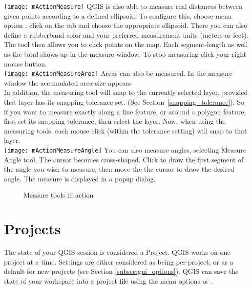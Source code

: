 \texttt{[image: mActionMeasure]}
QGIS is also able to measure real distances between given
points according to a defined ellipsoid. To configure this, choose menu option
 \arrow {},
click on the  tab and choose the appropriate ellipsoid. There
you can also define a rubberband color and your preferred measurement units
(meters or feet). The tool then allows you to click points on the map. Each
segment-length as well as the total shows up in the measure-window. To stop measuring click your right mouse button. \\
\texttt{[image: mActionMeasureArea]} Areas can also be measured.
In the measure window the accumulated area-size appears  \\
In addition, the measuring tool will snap to the currently selected layer, provided that layer has its snapping tolerance set. (See Section~\ref{snapping_tolerance}). So if you want to measure exactly along a line feature, or around a polygon feature, first set its snapping tolerance, then select the layer. Now, when using the measuring tools, each mouse click (within the tolerance setting) will snap to that layer. \\
\texttt{[image: mActionMeasureAngle]}
You can also measure angles, selecting Measure Angle tool. The cursor becomes
cross-shaped. Click to draw the first segment of the angle you wish to
measure, then move the the cursor to draw the desired angle. The measure
is displayed in a popup dialog.

\begin{figure}[ht]
\centering
     \hspace{0.33cm}
     \hspace{0.33cm}
   \caption{Measure tools in action \nixcaption} \label{fig:measure}
\end{figure}


\section{Projects}\label{sec:projects}

The state of your QGIS session is considered a Project.  QGIS
works on one project at a time.  Settings are either considered
as being per-project, or as a default for new projects (see
Section \ref{subsec:gui_options}). QGIS can save the state of your
workspace into a project file using the menu options
 \arrow {}
or  \arrow {}.

